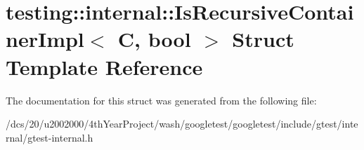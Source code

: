 \hypertarget{structtesting_1_1internal_1_1IsRecursiveContainerImpl}{}\section{testing\+:\+:internal\+:\+:Is\+Recursive\+Container\+Impl$<$ C, bool $>$ Struct Template Reference}
\label{structtesting_1_1internal_1_1IsRecursiveContainerImpl}


The documentation for this struct was generated from the following file\+:\begin{DoxyCompactItemize}
\item 
/dcs/20/u2002000/4th\+Year\+Project/wash/googletest/googletest/include/gtest/internal/gtest-\/internal.\+h\end{DoxyCompactItemize}
